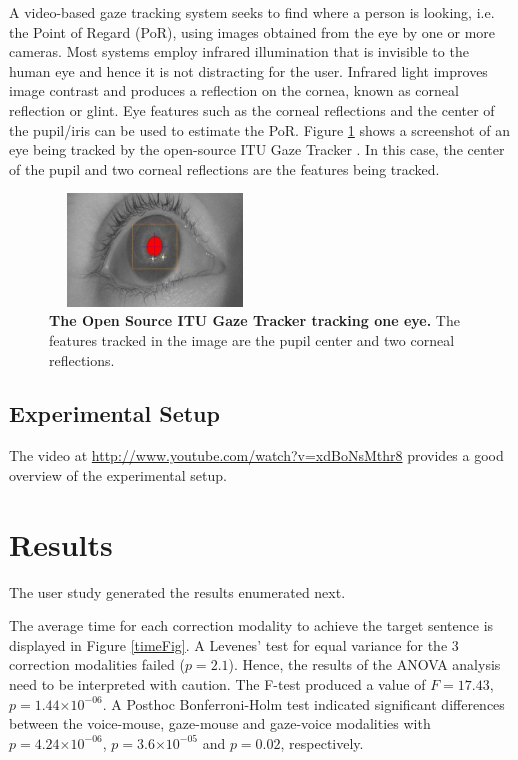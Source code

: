\documentclass[]{article}
\providecommand{\e}[1]{\ensuremath{\times 10^{#1}}}
\begin{document}
A video-based gaze tracking system seeks to find where a person is looking, i.e.
the Point of Regard (PoR), using images obtained from the eye by one
or more cameras. Most systems employ infrared
illumination that is invisible to the human eye and hence it is not distracting
for the user. Infrared light improves image contrast and produces a reflection
on the cornea, known as corneal reflection or glint. Eye features such as the
corneal reflections and the center of the pupil/iris can be used to estimate the
PoR. Figure \ref{screenGazeTracker} shows a screenshot of an eye being tracked
by the open-source ITU Gaze Tracker \cite{lowcostitugazetracker,Rozado2012}. In this case,
the center of the pupil and two corneal reflections are the features being
tracked.


\begin{figure}[ht]
\begin{center}
\includegraphics[width=0.5\textwidth, height=30mm]{figures/screenGazeTracker.jpg}
\vspace{-3mm}
\end{center}
\caption{\textbf{The Open Source ITU Gaze Tracker tracking one eye.} The
features tracked in the image are the pupil center and two corneal reflections.}
\label{screenGazeTracker}
\end{figure}


\subsection{Experimental Setup}
The video at \url{http://www.youtube.com/watch?v=xdBoNsMthr8} provides a good overview of the
experimental setup.

\section{Results}
The user study generated the results enumerated next.

The average time  for each correction modality to achieve the target sentence is displayed in Figure \ref{timeFig}.
A Levenes' test for equal variance for the 3 correction modalities failed ($p=2.1$). Hence, the results of the
ANOVA analysis need to be interpreted with caution. The F-test produced a value of $F=17.43$, $p=1.44\e{-06}$.
A Posthoc Bonferroni-Holm test indicated significant differences between the voice-mouse, gaze-mouse and gaze-voice
modalities with $p=4.24\e{-06}$, $p=3.6\e{-05}$ and $p=0.02$, respectively. 
 
\end{document}
